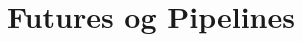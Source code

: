 \documentclass[../report.tex]{subfiles}
\begin{document}
\section{Futures og Pipelines}
\end{document}
